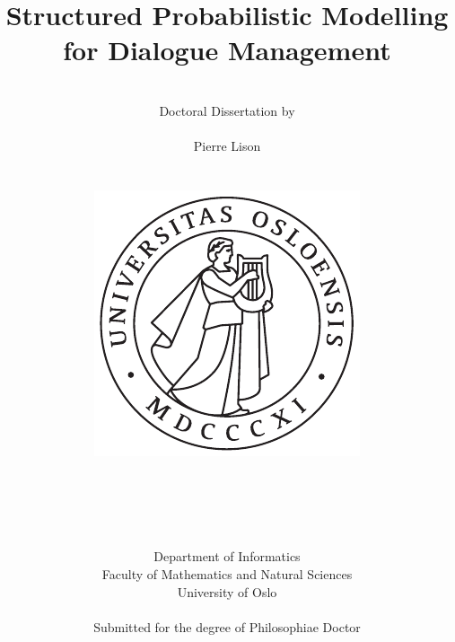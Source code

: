 \documentclass[english,12pt]{uiophd}
\title{\Huge{Structured Probabilistic Modelling \\ for Dialogue Management}}
\author{\\
Doctoral Dissertation by\\
\\
\Large{Pierre Lison} \\
\\
\\
 \includegraphics[scale=0.5]{imgs/uio.pdf}
\\
\\
\\
\\
\\
\\
 Department of Informatics\\
Faculty of Mathematics and Natural Sciences\\
University of Oslo\\
\\
Submitted for the degree of Philosophiae Doctor}
\begin{document}
\frontmatter
\maketitle


\cleardoublepage

\chapterfont{\centering}



%

\chapterfont{\raggedright}

\tableofcontents

\mainmatter





















\appendix



%



\backmatter





\end{document}
